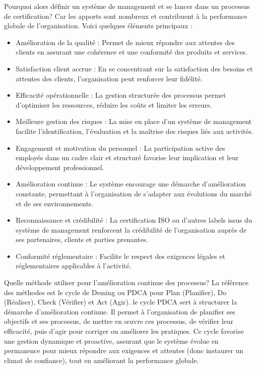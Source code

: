 Pourquoi alors définir un système de management et se lancer dans un processus de certification?
Car les apports sont nombreux et contribuent à la performance globale de l'organisation.
Voici quelques éléments principaux : 
\begin{itemize}
   \item Amélioration de la qualité : Permet de mieux répondre aux attentes des clients en assurant une cohérence et une conformité des produits et services.
   \item Satisfaction client accrue : En se concentrant sur la satisfaction des besoins et attentes des clients, l'organisation peut renforcer leur fidélité.
   \item Efficacité opérationnelle : La gestion structurée des processus permet d'optimiser les ressources, réduire les coûts et limiter les erreurs.
   \item Meilleure gestion des risques : La mise en place d'un système de management facilite l'identification, l'évaluation et la maîtrise des risques liés aux activités.
   \item Engagement et motivation du personnel : La participation active des employés dans un cadre clair et structuré favorise leur implication et leur développement professionnel.
   \item Amélioration continue : Le système encourage une démarche d'amélioration constante, permettant à l'organisation de s'adapter aux évolutions du marché et de ses environnements.
   \item Reconnaissance et crédibilité : La certification ISO ou d'autres labels issus du système de management renforcent la crédibilité de l'organisation auprès de ses partenaires, clients et parties prenantes.
   \item Conformité réglementaire : Facilite le respect des exigences légales et réglementaires applicables à l'activité.
\end{itemize}

Quelle méthode utiliser pour l'amélioration continue des processus?
La référence des méthodes est le cycle de Deming ou PDCA pour Plan (Planifier), Do (Réaliser), Check (Vérifier) et Act (Agir).
le cycle PDCA sert à structurer la démarche d'amélioration continue. Il permet à l'organisation de planifier ses objectifs et ses processus, de mettre en œuvre ces processus, de vérifier leur efficacité, puis d'agir pour corriger ou améliorer les pratiques. Ce cycle favorise une gestion dynamique et proactive, assurant que le système évolue en permanence pour mieux répondre aux exigences et attentes (donc instaurer un climat de confiance), tout en améliorant la performance globale.

